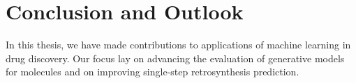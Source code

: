 \chapter{Conclusion and Outlook\label{chap:conclusion}}
In this thesis, we have made contributions to applications of machine learning in
drug discovery. Our focus lay on advancing the evaluation of generative models for
molecules and on improving single-step retrosynthesis prediction.